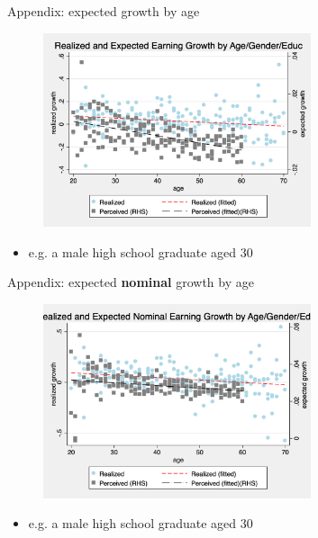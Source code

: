 \documentclass{beamer}
\begin{document}
\begin{frame}{Appendix: expected growth by age}
	\begin{figure}[ht]
		\label{appendix:age_gender_educ_level_compare_figure}
		\centering
		\includegraphics[width=0.7\textwidth]{figures/real_log_wage_shk_gr_level_by_age_edu_gender_compare.png}
	\end{figure}
	\begin{itemize}
		\item e.g. a male high school graduate aged 30 \quad  \hyperlink{age_compare}{} 
	\end{itemize}
\end{frame}


\begin{frame}{Appendix: expected \textbf{nominal} growth by age}
	\begin{figure}[ht]
		\label{appendix:age_gender_educ_nlevel_compare_figure}
		\centering
		\includegraphics[width=0.7\textwidth]{figures/real_log_wage_shk_gr_nlevel_by_age_edu_gender_compare.png}
	\end{figure}
	\begin{itemize}
		\item e.g. a male high school graduate aged 30 \quad  \hyperlink{age_compare}{} 
	\end{itemize}
\end{frame}
\end{document}
